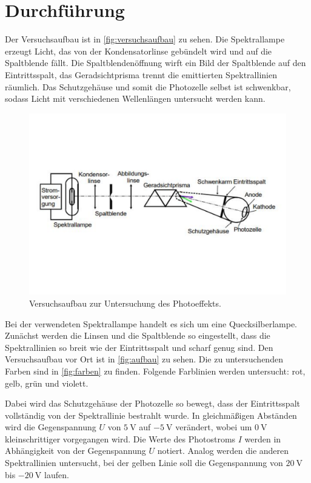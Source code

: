 \section{Durchführung}
\label{sec:Durchführung}

Der Versuchsaufbau ist in \autoref{fig:versuchsaufbau} zu sehen.
Die Spektrallampe erzeugt Licht, das von der Kondensatorlinse gebündelt wird und auf die Spaltblende fällt.
Die Spaltblendenöffnung wirft ein Bild der Spaltblende auf den Eintrittsspalt, das Geradsichtprisma trennt die emittierten Spektrallinien räumlich.
Das Schutzgehäuse und somit die Photozelle selbst ist schwenkbar, sodass Licht mit verschiedenen Wellenlängen untersucht werden kann.

\begin{figure}
    \centering
    \includegraphics[width =\textwidth]{content/versuchsaufbau.pdf}
    \caption{Versuchsaufbau zur Untersuchung des Photoeffekts.\cite{anleitung}}
    \label{fig:versuchsaufbau}
\end{figure}

Bei der verwendeten Spektrallampe handelt es sich um eine Quecksilberlampe.
Zunächst werden die Linsen und die Spaltblende so eingestellt, dass die Spektrallinien so breit wie der Eintrittsspalt und scharf genug sind.
Den Versuchsaufbau vor Ort ist in \autoref{fig:aufbau} zu sehen.
Die zu untersuchenden Farben sind in \autoref{fig:farben} zu finden.
Folgende Farblinien werden untersucht: rot, gelb, grün und violett.

Dabei wird das Schutzgehäuse der Photozelle so bewegt, dass der Eintrittsspalt vollständig von der Spektrallinie bestrahlt wurde.
In gleichmäßigen Abständen wird die Gegenspannung $U$ von $\SI{5}{\volt}$ auf $\SI{-5}{\volt}$ verändert, wobei um $\SI{0}{\volt}$ kleinschrittiger vorgegangen wird.
Die Werte des Photostroms $I$ werden in Abhängigkeit von der Gegenspannung $U$ notiert.
Analog werden die anderen Spektrallinien untersucht, bei der gelben Linie soll die Gegenspannung von $\SI{20}{\volt}$ bis $\SI{-20}{\volt}$ laufen.

